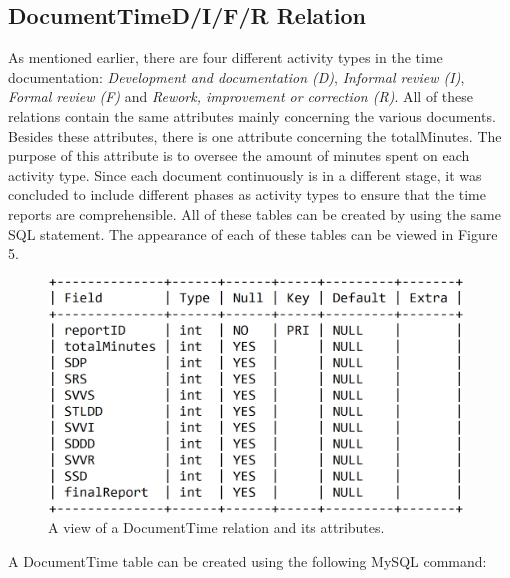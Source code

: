 \documentclass{article}
\begin{document}
\subsection{DocumentTimeD/I/F/R Relation}
As mentioned earlier, there are four different activity types in the time documentation: \emph{Development and documentation (D)}, \emph{Informal review (I)}, \emph{Formal review (F)} and \emph{Rework, improvement or correction (R)}. All of these relations contain the same attributes mainly concerning the various documents. Besides these attributes, there is one attribute concerning the totalMinutes. The purpose of this attribute is to oversee the amount of minutes spent on each activity type. Since each document continuously is in a different stage, it was concluded to include different phases as activity types to ensure that the time reports are comprehensible. All of these tables can be created by using the same SQL statement. The appearance of each of these tables can be viewed in Figure 5.

\begin{figure}[H]
     \centering
     \includegraphics[width=11cm]{images/SQL_tables/documenttime.png}
     \renewcommand\figurename{Figure}
     \caption{A view of a DocumentTime relation and its attributes.}
     \label{fig:my_label}
 \end{figure}
\newline

A DocumentTime table can be created using the following MySQL command:
\newline
\end{document}
